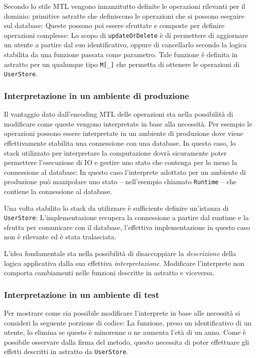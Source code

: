 Secondo lo stile MTL vengono innanzitutto definite le operazioni rilevanti per il dominio: primitive astratte che definiscono le operazioni che si possono eseguire sul database:
Queste possono poi essere sfruttate e composte per definire operazioni complesse:
Lo scopo di \lstinline{updateOrDelete} è di permettere di aggiornare un utente a partire dal suo identificativo, oppure di cancellarlo secondo la logica stabilita da una funzione passata come parametro.
Tale funzione è definita in astratto per un qualunque tipo \lstinline{M[_]} che permetta di ottenere le operazioni di \lstinline{UserStore}.

\subsubsection{Interpretazione in un ambiente di produzione}
Il vantaggio dato dall'encoding MTL delle operazioni sta nella possibilità di modificare come queste vengono interpretate in base alla necessità.
Per esempio le operazioni possono essere interpretate in un ambiente di produzione dove viene effettivamente stabilita una connessione con una database. In questo caso, lo stack utilizzato per interpretare la computazione dovrà sicuramente poter permettere l'esecuzione di IO e gestire uno stato che contenga per lo meno la connessione al database:
In questo caso l'interprete adottato per un ambiente di produzione può manipolare uno stato -- nell'esempio chiamato \lstinline{Runtime} -- che contiene la connessione al database.

Una volta stabilito lo stack da utilizzare è sufficiente definire un'istanza di \lstinline{UserStore}:
L'implementazione recupera la connessione a partire dal runtime e la sfrutta per comunicare con il database, l'effettiva implementazione in questo caso non è rilevante ed è stata tralasciata.

L'idea fondamentale sta nella possibilità di disaccoppiare la \emph{descrizione} della logica applicativa dalla sua effettiva \emph{interpretazione}. Modificare l'interprete non comporta cambiamenti nelle funzioni descritte in astratto e viceversa.

\subsubsection{Interpretazione in un ambiente di test}
Per mostrare come sia possibile modificare l'interprete in base alle necessità si consideri la seguente porzione di codice:
La funzione, preso un identificativo di un utente, lo elimina se questo è minorenne o ne aumenta l'età di un anno. Come è possibile osservare dalla firma del metodo, questo necessita di poter effettuare gli effetti descritti in astratto da \lstinline{UserStore}.

